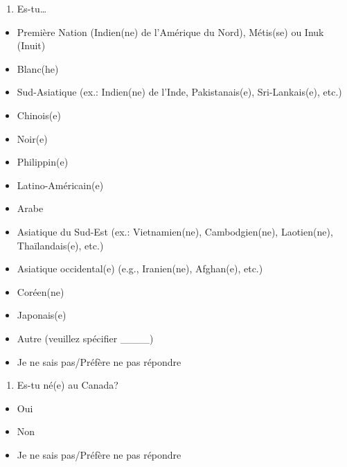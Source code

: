\documentclass[
  letterpaper,
  DIV=11,
  numbers=noendperiod]{scrreprt}
\providecommand{\tightlist}{%
  \setlength{\itemsep}{0pt}\setlength{\parskip}{0pt}}\usepackage{longtable,booktabs,array}
\begin{document}
\begin{enumerate}
\def\labelenumi{\arabic{enumi}.}
\setcounter{enumi}{17}
\tightlist
\item
  Es-tu\ldots{}
\end{enumerate}

\begin{itemize}
\tightlist
\item
  Première Nation (Indien(ne) de l'Amérique du Nord), Métis(se) ou Inuk
  (Inuit)
\item
  Blanc(he)
\item
  Sud-Asiatique (ex.: Indien(ne) de l'Inde, Pakistanais(e),
  Sri-Lankais(e), etc.)
\item
  Chinois(e)
\item
  Noir(e)
\item
  Philippin(e)
\item
  Latino-Américain(e)
\item
  Arabe
\item
  Asiatique du Sud-Est (ex.: Vietnamien(ne), Cambodgien(ne),
  Laotien(ne), Thaïlandais(e), etc.)
\item
  Asiatique occidental(e) (e.g., Iranien(ne), Afghan(e), etc.)
\item
  Coréen(ne)
\item
  Japonais(e)
\item
  Autre (veuillez spécifier \_\_\_\_)
\item
  Je ne sais pas/Préfère ne pas répondre
\end{itemize}

\begin{enumerate}
\def\labelenumi{\arabic{enumi}.}
\setcounter{enumi}{18}
\tightlist
\item
  Es-tu né(e) au Canada?
\end{enumerate}

\begin{itemize}
\tightlist
\item
  Oui
\item
  Non
\item
  Je ne sais pas/Préfère ne pas répondre
\end{itemize}
\end{document}
